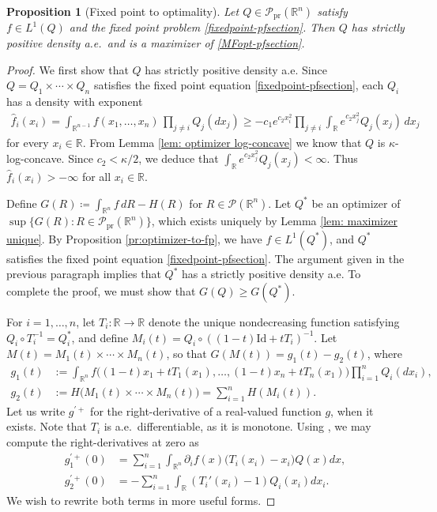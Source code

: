 \documentclass[11pt,reqno]{amsart}
\numberwithin{equation}{section}
\newtheorem{proposition}[theorem]{Proposition}
\theoremstyle{definition}
\def\R{{\mathbb R}}
\def\P{{\mathcal P}}
\def\Pprod{\P_{\mathrm{pr}}}
\begin{document}
\begin{proposition}[Fixed point to optimality] \label{pr:fp-to-optimizer}
	 Let $ Q \in \Pprod(\R^n)$ satisfy $ f \in L^1(Q) $ and the fixed point problem \eqref{fixedpoint-pfsection}.
Then $Q$ has strictly positive density a.e.\ and is a maximizer of \eqref{MFopt-pfsection}.
\end{proposition}		
\begin{proof}
We first show that  $ Q $ has strictly positive density a.e. Since $ Q = Q_1 \times \cdots \times Q_n $ satisfies the fixed point equation \eqref{fixedpoint-pfsection}, each $ Q_i $ has a  density with exponent
\begin{align*} 
	\hat{f}_i(x_i) = \int_{\R^{n-1}} f(x_1,\ldots,x_n) \, \prod_{j \neq i} Q_j(dx_j)  \ge -c_1 e^{c_2x_i^2} \prod_{j \neq i}  \int_{\R} e^{c_2x_j^2}  Q_j(x_j) \, dx_j
\end{align*}
for every $ x_i \in \R $. From Lemma \ref{lem: optimizer log-concave} we know that $Q$ is $ \kappa $-log-concave.
Since $c_2 < \kappa/2$, we deduce that $\int_{\R} e^{c_2x_j^2}  Q_j(x_j) < \infty$.
Thus $ \hat{f}_i (x_i) > -\infty$ for all $ x_i \in \R $. 

Define $G(R) \coloneqq \int_{\R^n} f \, dR- H(R)$ for $R \in \P(\R^n)$. Let $Q^*$ be an optimizer of $\sup\{G(R) : R \in \Pprod(\R^n)\}$, which exists uniquely by Lemma \ref{lem: maximizer unique}. By Proposition \ref{pr:optimizer-to-fp}, we have $f \in L^1(Q^*)$, and  $Q^*$ satisfies the fixed point equation \eqref{fixedpoint-pfsection}. The argument given in the previous paragraph  implies that $Q^*$ has a strictly positive density a.e.
To complete the proof, we must show that $G(Q) \ge G(Q^*)$.
	
For $i=1,\ldots,n$, let $T_i : \R \to \R$ denote the unique nondecreasing function satisfying $Q_i \circ T_i^{-1}=Q^*_i$, and define $M_i(t) = Q_i \circ ((1-t)\mathrm{Id} + tT_i)^{-1}$. Let $M(t) = M_1(t) \times \cdots \times M_n(t)$, so that $G(M(t))=g_1(t)-g_2(t)$, where
	\begin{align*}
		g_1(t) &:= \int_{\R^n} f\big((1-t)x_1 + tT_1(x_1),\ldots,(1-t)x_n + tT_n(x_1)\big) \prod_{i=1}^n Q_i(dx_i), \\
		g_2(t) &:= H\big(M_1(t) \times \cdots \times M_n(t)\big) = \sum_{i=1}^nH(M_i(t)).
	\end{align*}
	Let us write $g^{\prime +}$ for the right-derivative of a real-valued function $g$, when it exists. 
	Note that $T_i$ is a.e.\ differentiable, as it is monotone.
	Using \cite[Theorem 5.30]{villani2003topics}, we may compute the right-derivatives at zero as
	\begin{align*} 
		g_1^{\prime +}(0) &= \sum_{i=1}^n \int_{\R^n}   \partial_i f (x) \big( T_i (x_i) -x_i \big) Q(x) dx, 
		 \\
		g_2^{\prime +}(0) &= - \sum_{i=1}^n \int_{\R}  \left(T_i'(x_i) - 1\right)Q_i(x_i) dx_i. 
	\end{align*}
	We wish to rewrite both terms in more useful forms. 
	

\end{proof}
\end{document}
